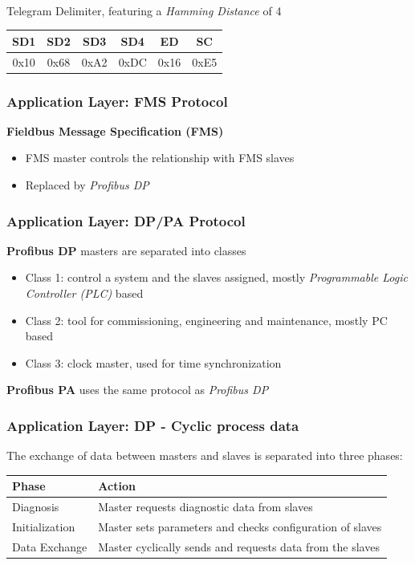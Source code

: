 \documentclass{beamer}
\begin{document}
\begin{frame}
\begin{enumerate}
      \hfill \\
  \end{enumerate}
  Telegram Delimiter, featuring a \textit{Hamming Distance} of 4 \\
  \footnotesize
  \begin{tabular}[h]{|c|c|c|c|c|c|}
    \hline
    SD1   & SD2   & SD3   & SD4   & ED    & SC \\
    \hline
    0x10  & 0x68  & 0xA2  & 0xDC  & 0x16  & 0xE5 \\
    \hline
  \end{tabular}
  \normalsize
\end{frame}

\begin{frame}
  \frametitle{Application Layer: FMS Protocol}
  \textbf{Fieldbus Message Specification (FMS)}
  \begin{itemize}
    \item FMS master controls the relationship with FMS slaves
    \item Replaced by \textit{Profibus DP}
  \end{itemize}
\end{frame}

\begin{frame}
  \frametitle{Application Layer: DP/PA Protocol}
  \textbf{Profibus DP} masters are separated into classes
  \begin{itemize}
    \item Class 1: control a system and the slaves assigned, mostly \textit{Programmable
      Logic Controller (PLC)} based
    \item Class 2: tool for commissioning, engineering and maintenance, mostly PC
      based
    \item Class 3: clock master, used for time synchronization
  \end{itemize}
  \vspace{10pt}
  \textbf{Profibus PA} uses the same protocol as \textit{Profibus DP}
\end{frame}

\begin{frame}
  \frametitle{Application Layer: DP - Cyclic process data}
  The exchange of data between masters and slaves is separated into three
  phases:~\cite{profibusmanual}
  \begin{center}
    \footnotesize
    \begin{tabular}[h]{l|l}
      \textbf{Phase}  & \textbf{Action} \\
      \hline
      Diagnosis       & Master requests diagnostic data from slaves \\
      Initialization  & Master sets parameters and checks configuration of slaves \\
      Data Exchange   & Master cyclically sends and requests data from the slaves
    \end{tabular}
  \end{center}
\end{frame}
\end{document}
